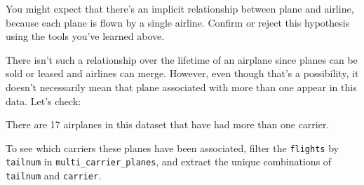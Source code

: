 \documentclass[]{book}
\newenvironment{Shaded}{\begin{snugshade}}{\end{snugshade}}
\newcommand{\CommentTok}[1]{\textcolor[rgb]{0.56,0.35,0.01}{\textit{#1}}}
\newcommand{\DataTypeTok}[1]{\textcolor[rgb]{0.13,0.29,0.53}{#1}}
\newcommand{\DecValTok}[1]{\textcolor[rgb]{0.00,0.00,0.81}{#1}}
\newcommand{\KeywordTok}[1]{\textcolor[rgb]{0.13,0.29,0.53}{\textbf{#1}}}
\newcommand{\NormalTok}[1]{#1}
\newcommand{\OperatorTok}[1]{\textcolor[rgb]{0.81,0.36,0.00}{\textbf{#1}}}
\newcommand{\StringTok}[1]{\textcolor[rgb]{0.31,0.60,0.02}{#1}}
\theoremstyle{plain}
\theoremstyle{remark}
\theoremstyle{definition}
\theoremstyle{definition}
\theoremstyle{definition}
\theoremstyle{remark}
\begin{document}
You might expect that there's an implicit relationship between plane and
airline, because each plane is flown by a single airline. Confirm or
reject this hypothesis using the tools you've learned above.

There isn't such a relationship over the lifetime of an airplane since
planes can be sold or leased and airlines can merge. However, even
though that's a possibility, it doesn't necessarily mean that plane
associated with more than one appear in this data. Let's check:

\begin{Shaded}
\end{Shaded}

There are 17 airplanes in this dataset that have had more than one
carrier.

To see which carriers these planes have been associated, filter the
\texttt{flights} by \texttt{tailnum} in \texttt{multi\_carrier\_planes},
and extract the unique combinations of \texttt{tailnum} and
\texttt{carrier}.

\begin{Shaded}
\end{Shaded}
\end{document}
